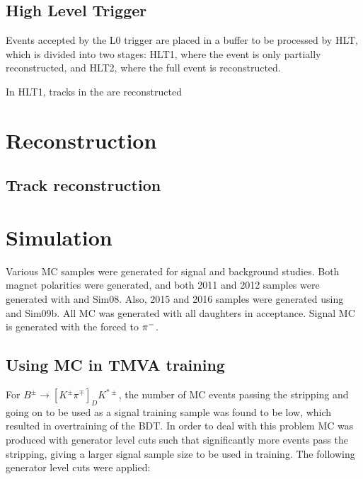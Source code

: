 \subsection{High Level Trigger}

Events accepted by the L0 trigger are placed in a buffer to be processed by HLT, which is divided into two stages: HLT1, where the event is only partially reconstructed, and HLT2, where the full event is reconstructed.

In HLT1, tracks in the \velo are reconstructed

\section{Reconstruction}

\subsection{Track reconstruction}

\section{Simulation}

Various MC samples were generated for signal and background studies. Both magnet polarities were generated, and both 2011 and 2012 samples were generated with  and Sim08. Also, 2015 and 2016 samples were generated using  and Sim09b. All MC was generated with all daughters in \lhcb acceptance. Signal MC is generated with the \Kstarm forced to \KS${{\pi}^-}$.

\cite{LHCb-DP-2011-002}


\subsection{Using MC in TMVA training}
\label{sec:mc:tmva}

For $B^{\pm} \to [K^{\pm}\pi^{\mp}]_D K^{*\pm}$, the number of MC events passing the stripping and going on to be used as a signal training sample was found to be low, which resulted in overtraining of the BDT. In order to deal with this problem MC was produced with generator level cuts such that significantly more events pass the stripping, giving a larger signal sample size to be used in training. The following generator level cuts were applied:

